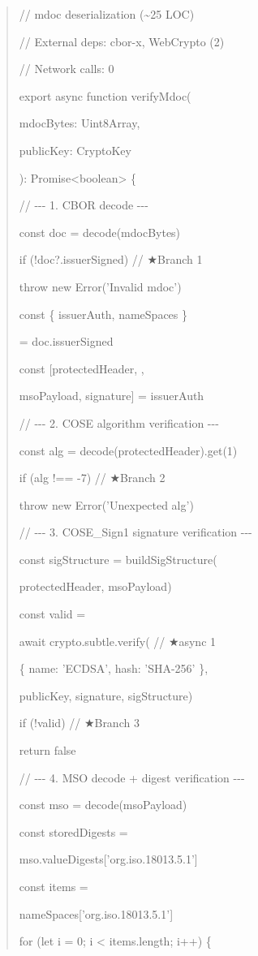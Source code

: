 \documentclass[conference]{IEEEtran}
\begin{document}
\begin{quote}
// mdoc deserialization (\textasciitilde25 LOC)

// External deps: cbor-x, WebCrypto (2)

// Network calls: 0

export async function verifyMdoc(

mdocBytes: Uint8Array,

publicKey: CryptoKey

): Promise\textless boolean\textgreater{} \{

// -\/-\/- 1. CBOR decode -\/-\/-

const doc = decode(mdocBytes)

if (!doc?.issuerSigned) // ★Branch 1

throw new Error('Invalid mdoc')

const \{ issuerAuth, nameSpaces \}

= doc.issuerSigned

const {[}protectedHeader, ,

msoPayload, signature{]} = issuerAuth

// -\/-\/- 2. COSE algorithm verification -\/-\/-

const alg = decode(protectedHeader).get(1)

if (alg !== -7) // ★Branch 2

throw new Error('Unexpected alg')

// -\/-\/- 3. COSE\_Sign1 signature verification -\/-\/-

const sigStructure = buildSigStructure(

protectedHeader, msoPayload)

const valid =

await crypto.subtle.verify( // ★async 1

\{ name: 'ECDSA', hash: 'SHA-256' \},

publicKey, signature, sigStructure)

if (!valid) // ★Branch 3

return false

// -\/-\/- 4. MSO decode + digest verification -\/-\/-

const mso = decode(msoPayload)

const storedDigests =

mso.valueDigests{[}'org.iso.18013.5.1'{]}

const items =

nameSpaces{[}'org.iso.18013.5.1'{]}

for (let i = 0; i \textless{} items.length; i++) \{


\end{quote}
\end{document}
